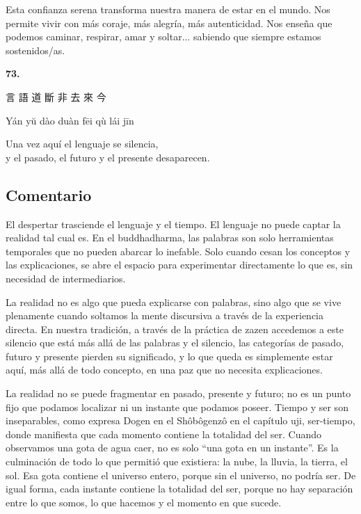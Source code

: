 \documentclass[
  a5paperpaper,
]{article}
\begin{document}
Esta confianza serena transforma nuestra manera de estar en el mundo.
Nos permite vivir con más coraje, más alegría, más autenticidad. Nos
enseña que podemos caminar, respirar, amar y soltar... sabiendo que
siempre estamos sostenidos/as.

\hfill\break

\hypertarget{03}{}
\begin{verseblock}

\newpage

\begin{center}\textbf{73.}\end{center}

言 語 道 斷 非 去 來 今

Yán yŭ dào duàn fēi qù lái jīn

Una vez aquí el lenguaje se silencia,\\
y el pasado, el futuro y el presente desaparecen.

\end{verseblock}

\hfill\break

\hypertarget{comentario-72}{%
\subsection{Comentario}\label{comentario-72}}

El despertar trasciende el lenguaje y el tiempo. El lenguaje no puede
captar la realidad tal cual es. En el buddhadharma, las palabras son
solo herramientas temporales que no pueden abarcar lo inefable. Solo
cuando cesan los conceptos y las explicaciones, se abre el espacio para
experimentar directamente lo que es, sin necesidad de intermediarios.

La realidad no es algo que pueda explicarse con palabras, sino algo que
se vive plenamente cuando soltamos la mente discursiva a través de la
experiencia directa. En nuestra tradición, a través de la práctica de
zazen accedemos a este silencio que está más allá de las palabras y el
silencio, las categorías de pasado, futuro y presente pierden su
significado, y lo que queda es simplemente estar aquí, más allá de todo
concepto, en una paz que no necesita explicaciones.

La realidad no se puede fragmentar en pasado, presente y futuro; no es
un punto fijo que podamos localizar ni un instante que podamos poseer.
Tiempo y ser son inseparables, como expresa Dogen en el Shôbôgenzô en el
capítulo uji, ser-tiempo, donde manifiesta que cada momento contiene la
totalidad del ser. Cuando observamos una gota de agua caer, no es solo
``una gota en un instante''. Es la culminación de todo lo que permitió
que existiera: la nube, la lluvia, la tierra, el sol. Esa gota contiene
el universo entero, porque sin el universo, no podría ser. De igual
forma, cada instante contiene la totalidad del ser, porque no hay
separación entre lo que somos, lo que hacemos y el momento en que
sucede.
\end{document}
